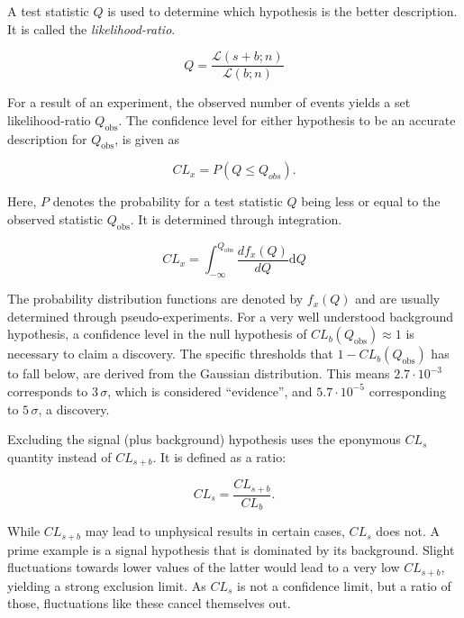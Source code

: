 A test statistic $Q$ is used to determine which hypothesis is the better description. It is called the \textit{likelihood-ratio}.

\begin{equation}
  \label{eq:testq}
  Q = \frac{\mathcal{L} (s + b; n)}{\mathcal{L} (b; n)}
\end{equation}

For a result of an experiment, the observed number of events yields a set likelihood-ratio $Q_{\text{obs}}$. The confidence level for either hypothesis to be an accurate description for $Q_{\text{obs}}$, is given as

\begin{equation}
  \label{eq:cl-prob}
  CL_x = P (Q \leq Q_{obs}).
\end{equation}

\noindent Here, $P$ denotes the probability for a test statistic $Q$ being less or equal to the observed statistic $Q_{\text{obs}}$. It is determined through integration.

\begin{equation}
  \label{eq:clx}
  CL_x = \int^{Q_{\text{obs}}}_{-\infty} \frac{d f_x(Q)}{d Q} \text{d} Q
\end{equation}

\noindent The probability distribution functions are denoted by $f_x(Q)$ and are usually determined through pseudo-experiments. For a very well understood background hypothesis, a confidence level in the null hypothesis of $CL_b (Q_{\text{obs}}) \approx 1$ is necessary to claim a discovery. The specific thresholds that $1 - CL_b (Q_{\text{obs}})$ has to fall below, are derived from the Gaussian distribution. This means $2.7 \cdot 10^{-3}$ corresponds to $3\,\sigma$, which is considered ``evidence'', and $5.7 \cdot 10^{-5}$ corresponding to $5\,\sigma$, a discovery.

Excluding the signal (plus background) hypothesis uses the eponymous $CL_s$ quantity instead of $CL_{s+b}$. It is defined as a ratio:

\begin{equation}
  \label{eq:cls}
  CL_s = \frac{CL_{s+b}}{CL_b}.
\end{equation}

\noindent While $CL_{s+b}$ may lead to unphysical results in certain cases, $CL_s$ does not. A prime example is a signal hypothesis that is dominated by its background. Slight fluctuations towards lower values of the latter would lead to a very low $CL_{s+b}$, yielding a strong exclusion limit. As $CL_s$ is not a confidence limit, but a ratio of those, fluctuations like these cancel themselves out.

